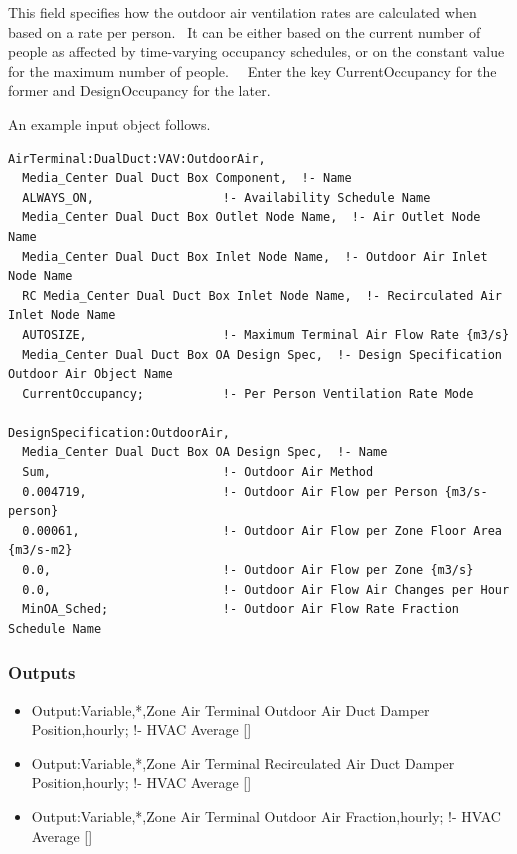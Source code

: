 This field specifies how the outdoor air ventilation rates are calculated when based on a rate per person.~ It can be either based on the current number of people as affected by time-varying occupancy schedules, or on the constant value for the maximum number of people.~~ Enter the key CurrentOccupancy for the former and DesignOccupancy for the later.

An example input object follows.

\begin{lstlisting}
AirTerminal:DualDuct:VAV:OutdoorAir,
  Media_Center Dual Duct Box Component,  !- Name
  ALWAYS_ON,                  !- Availability Schedule Name
  Media_Center Dual Duct Box Outlet Node Name,  !- Air Outlet Node Name
  Media_Center Dual Duct Box Inlet Node Name,  !- Outdoor Air Inlet Node Name
  RC Media_Center Dual Duct Box Inlet Node Name,  !- Recirculated Air Inlet Node Name
  AUTOSIZE,                   !- Maximum Terminal Air Flow Rate {m3/s}
  Media_Center Dual Duct Box OA Design Spec,  !- Design Specification Outdoor Air Object Name
  CurrentOccupancy;           !- Per Person Ventilation Rate Mode

DesignSpecification:OutdoorAir,
  Media_Center Dual Duct Box OA Design Spec,  !- Name
  Sum,                        !- Outdoor Air Method
  0.004719,                   !- Outdoor Air Flow per Person {m3/s-person}
  0.00061,                    !- Outdoor Air Flow per Zone Floor Area {m3/s-m2}
  0.0,                        !- Outdoor Air Flow per Zone {m3/s}
  0.0,                        !- Outdoor Air Flow Air Changes per Hour
  MinOA_Sched;                !- Outdoor Air Flow Rate Fraction Schedule Name
\end{lstlisting}

\subsubsection{Outputs}\label{outputs-14}

\begin{itemize}
\item
  Output:Variable,*,Zone Air Terminal Outdoor Air Duct Damper Position,hourly; !- HVAC Average {[]}
\item
  Output:Variable,*,Zone Air Terminal Recirculated Air Duct Damper Position,hourly; !- HVAC Average {[]}
\item
  Output:Variable,*,Zone Air Terminal Outdoor Air Fraction,hourly; !- HVAC Average {[]}
\end{itemize}

